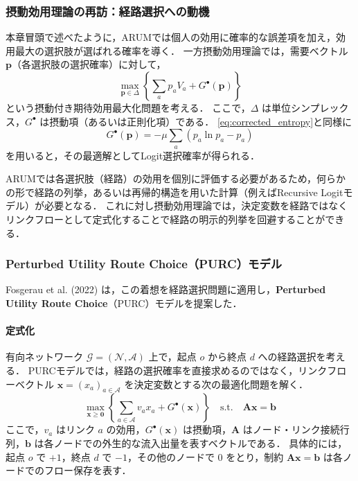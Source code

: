 \subsubsection{摂動効用理論の再訪：経路選択への動機}
本章冒頭で述べたように，ARUMでは個人の効用に確率的な誤差項を加え，効用最大の選択肢が選ばれる確率を導く．
一方摂動効用理論では，需要ベクトル $\bm{p}$（各選択肢の選択確率）に対して，
\begin{equation}
  \max_{\bm{p} \in \Delta} \left\{ \sum_{a} p_a V_a + G^\bullet(\bm{p}) \right\}
\end{equation} 
という摂動付き期待効用最大化問題を考える．
ここで，$\Delta$ は単位シンプレックス，$G^\bullet$ は摂動項（あるいは正則化項）である．
\eqref{eq:corrected_entropy}と同様に
\begin{equation}
  G^\bullet(\bm{p}) = -\mu \sum_a \left( p_a \ln p_a - p_a \right)
\end{equation}
を用いると，その最適解としてLogit選択確率が得られる．

ARUMでは各選択肢（経路）の効用を個別に評価する必要があるため，何らかの形で経路の列挙，あるいは再帰的構造を用いた計算（例えばRecursive Logitモデル）が必要となる．
これに対し摂動効用理論では，決定変数を経路ではなくリンクフローとして定式化することで経路の明示的列挙を回避することができる．

\subsubsection{Perturbed Utility Route Choice（PURC）モデル}
Fosgerau et al. (2022) \cite{fosgerau2022perturbed} は，この着想を経路選択問題に適用し，\textbf{Perturbed Utility Route Choice}（PURC）モデルを提案した．

\paragraph{定式化}
有向ネットワーク $\mathcal{G} = (\mathcal{N}, \mathcal{A})$ 上で，起点 $o$ から終点 $d$ への経路選択を考える．
PURCモデルでは，経路の選択確率を直接求めるのではなく，リンクフローベクトル $\bm{x} = (x_a)_{a \in \mathcal{A}}$ を決定変数とする次の最適化問題を解く．
\begin{equation}\label{eq:purc}
  \max_{\bm{x} \geq \bm{0}}
  \left\{\sum_{a \in \mathcal{A}} v_a x_a + G^\bullet(\bm{x})\right\} \quad \text{s.t.} \quad \bm{A}\bm{x} = \bm{b}
\end{equation}
ここで，$v_a$ はリンク $a$ の効用，$G^\bullet(\bm{x})$ は摂動項，$\bm{A}$ はノード・リンク接続行列，$\bm{b}$ は各ノードでの外生的な流入出量を表すベクトルである．
具体的には，起点 $o$ で $+1$，終点 $d$ で $-1$，その他のノードで $0$ をとり，制約 $\bm{A}\bm{x}=\bm{b}$ は各ノードでのフロー保存を表す．

